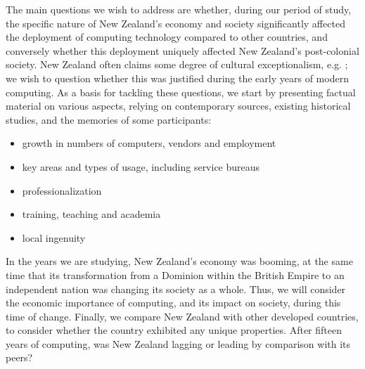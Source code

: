 \documentclass{IEEEcsmag}
\begin{document}
The main questions we wish to address are whether, during our period of study,
the specific nature of New Zealand’s economy and society significantly affected
\cbend  %
the deployment of computing technology compared to other countries,
\cbstart  %
and conversely whether this deployment
uniquely affected New Zealand’s post-colonial society.
New Zealand often claims some degree of cultural exceptionalism, e.g. \cite{Frykberg-2025}; we wish to question whether this was justified during the early years of modern computing. As a basis for tackling these questions, we start by presenting factual material on various aspects, relying on contemporary sources, existing historical studies, and the memories of some participants:
\cbend

\begin{itemize}
\item growth in numbers of computers, vendors and employment
\item key areas  and types of usage, including service bureaus
\item professionalization
\item training, teaching and academia
\item local ingenuity
\end{itemize}

\cbstart
In the years we are studying, New Zealand’s economy was booming, at the same time that its transformation from a Dominion within the British Empire to an independent nation was changing its society as a whole. Thus, we will
consider the economic importance of computing, and its impact on society, during this time of change. Finally, we compare New Zealand with other developed countries, to consider whether the country exhibited any unique properties. After fifteen years of computing, was New Zealand lagging or leading by comparison with its peers?
\cbend
\vspace*{-8pt}
\end{document}
